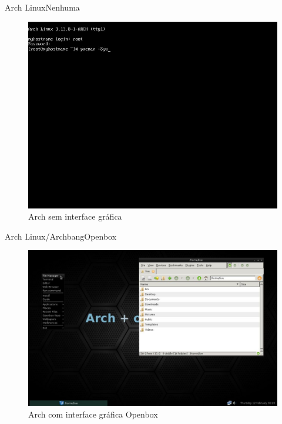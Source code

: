 \documentclass{beamer}
\begin{document}
\begin{frame}{Arch Linux}{Nenhuma}
 \begin{figure}[h!]
        \centering
        \includegraphics[scale=0.27]{archTTY.jpg}
        \caption{Arch sem interface gráfica}
        \label{fig:Comando ls}
    \end{figure}
\end{frame}

\begin{frame}{Arch Linux/Archbang}{Openbox}
 \begin{figure}[h!]
        \centering
        \includegraphics[scale=0.27]{archbang.jpg}
        \caption{Arch com interface gráfica Openbox}
        \label{fig:Comando ls}
    \end{figure}
\end{frame}
\end{document}
